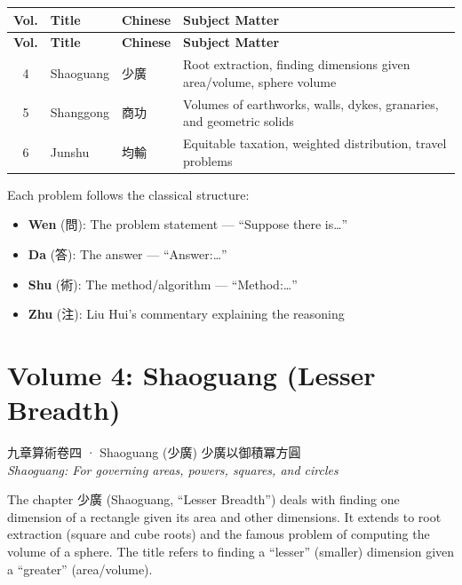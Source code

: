 \documentclass[11pt,a4paper]{article}
\newcommand{\zh}[1]{#1}
\begin{document}
\begin{center}
\begin{longtable}{|c|l|l|p{5cm}|}
\hline
\textbf{Vol.} & \textbf{Title} & \textbf{Chinese} & \textbf{Subject Matter} \\
\hline
\endfirsthead
\hline
\textbf{Vol.} & \textbf{Title} & \textbf{Chinese} & \textbf{Subject Matter} \\
\hline
\endhead
4 & Shaoguang & \zh{少廣} & Root extraction, finding dimensions given area/volume, sphere volume \\
5 & Shanggong & \zh{商功} & Volumes of earthworks, walls, dykes, granaries, and geometric solids \\
6 & Junshu & \zh{均輸} & Equitable taxation, weighted distribution, travel problems \\
\hline
\end{longtable}
\end{center}

Each problem follows the classical structure:
\begin{itemize}[leftmargin=2em]
  \item \textbf{Wen} (\zh{問}): The problem statement --- ``Suppose there is\ldots''
  \item \textbf{Da} (\zh{答}): The answer --- ``Answer:\ldots''
  \item \textbf{Shu} (\zh{術}): The method/algorithm --- ``Method:\ldots''
  \item \textbf{Zhu} (\zh{注}): Liu Hui's commentary explaining the reasoning
\end{itemize}

\newpage

\section{Volume 4: Shaoguang (Lesser Breadth)}

\begin{volumeheader}{\zh{九章算術卷四} · Shaoguang (\zh{少廣})}
\zh{少廣以御積冪方圓}\\[0.3em]
\small\textit{Shaoguang: For governing areas, powers, squares, and circles}
\end{volumeheader}

\vspace{0.5cm}

\noindent
The chapter \zh{少廣} (Shaoguang, ``Lesser Breadth'') deals with finding one dimension of a rectangle given its area and other dimensions. It extends to root extraction (square and cube roots) and the famous problem of computing the volume of a sphere. The title refers to finding a ``lesser'' (smaller) dimension given a ``greater'' (area/volume).
\end{document}
